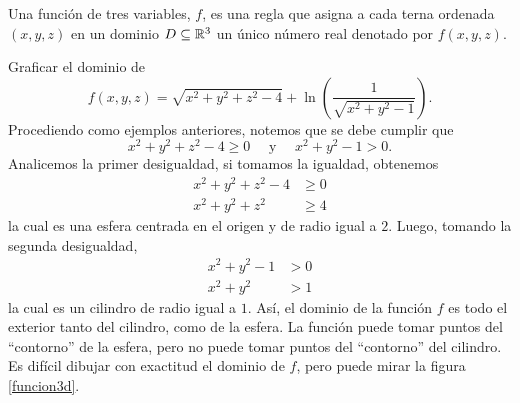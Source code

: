 \begin{definition}
    Una función de tres variables, $f$, es una regla que asigna a cada terna ordenada $(x, y, z)$ en un dominio $D \subseteq \RR[3]$ un único número real denotado por $f(x, y, z)$.
\end{definition}

\begin{example}
    Graficar el dominio de
    $$f(x, y, z) = \sqrt{x^2 + y^2 + z^2 - 4} + \ln \left( \frac{1}{\sqrt{x^2 + y^2 -1}} \right).$$
    \solucion Procediendo como ejemplos anteriores, notemos que se debe cumplir que
    $$x^2 + y^2 + z^2 - 4 \geq 0 \quad \text{ y } \quad x^2 + y^2 - 1 > 0.$$
    Analicemos la primer desigualdad, si tomamos la igualdad, obtenemos
    \begin{align*}
        x^2 + y^2 + z^2 - 4 & \geq 0 \\
        x^2 + y^2 + z^2 & \geq 4
    \end{align*}
    la cual es una esfera centrada en el origen y de radio igual a $2$. Luego, tomando la segunda desigualdad,
    \begin{align*}
        x^2 + y^2 - 1 & > 0 \\
        x^2 + y^2 & > 1
    \end{align*}
    la cual es un cilindro de radio igual a $1$. Así, el dominio de la función $f$ es todo el exterior tanto del cilindro, como de la esfera. La función puede tomar puntos del “contorno” de la esfera, pero no puede tomar puntos del “contorno” del cilindro. Es difícil dibujar con exactitud el dominio de $f$, pero puede mirar la figura \ref{funcion3d}.\sideFigure[\label{funcion3d}]{
}
\end{example}
